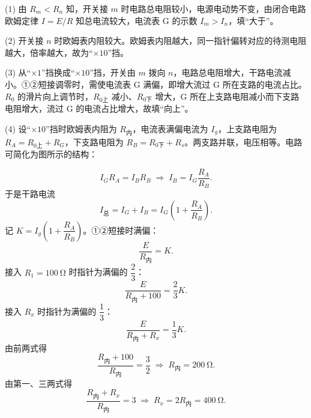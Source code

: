 \begin{answer}
(1) 由 $R_{m}<R_{n}$ 知，开关接 $m$ 时电路总电阻较小，电源电动势不变，由闭合电路欧姆定律 $I=E/R$ 知总电流较大，电流表 $\mathrm{G}$ 的示数 $I_{m}>I_{n}$，填“大于”。

(2) 开关接 $n$ 时欧姆表内阻较大。欧姆表内阻越大，同一指针偏转对应的待测电阻越大，倍率越大，故为“$\times10$”挡。

(3) 从“$\times1$”挡换成“$\times10$”挡，开关由 $m$ 拨向 $n$，电路总电阻增大，干路电流减小。①②短接调零时，需使电流表 $\mathrm{G}$ 满偏，即增大流过 $\mathrm{G}$ 所在支路的电流占比。$R_{0}$ 的滑片向上调节时，$R_{0\text{上}}$ 减小、$R_{0\text{下}}$ 增大，$\mathrm{G}$ 所在上支路电阻减小而下支路电阻增大，流过 $\mathrm{G}$ 的电流占比增大，故填“向上”。

(4) 设“$\times10$”挡时欧姆表内阻为 $R_{\text{内}}$，电流表满偏电流为 $I_{g}$，上支路电阻为 $R_{A}=R_{0\text{上}}+R_{G}$，下支路电阻为 $R_{B}=R_{0\text{下}}+R_{s}$。两支路并联，电压相等。电路可简化为图所示的结构：


\begin{equation*}
  I_{G}R_{A}=I_{B}R_{B}
  \;\Longrightarrow\;
  I_{B}=I_{G}\frac{R_{A}}{R_{B}} .
\end{equation*}
于是干路电流
\[
  I_{\text{总}}=I_{G}+I_{B}=I_{G}\left(1+\frac{R_{A}}{R_{B}}\right).
\]
记 $K=I_{g}\left(1+\dfrac{R_{A}}{R_{B}}\right)$。①②短接时满偏：
\[
  \frac{E}{R_{\text{内}}}=K .
\]
接入 $R_{1}=\SI{100}{\ohm}$ 时指针为满偏的 $\dfrac{2}{3}$：
\[
  \frac{E}{R_{\text{内}}+100}=\frac{2}{3}K .
\]
接入 $R_{x}$ 时指针为满偏的 $\dfrac{1}{3}$：
\[
  \frac{E}{R_{\text{内}}+R_{x}}=\frac{1}{3}K .
\]
由前两式得
\[
  \frac{R_{\text{内}}+100}{R_{\text{内}}}=\frac{3}{2}
  \;\Longrightarrow\;
  R_{\text{内}}=\SI{200}{\ohm}.
\]
由第一、三两式得
\[
  \frac{R_{\text{内}}+R_{x}}{R_{\text{内}}}=3
  \;\Longrightarrow\;
  R_{x}=2R_{\text{内}}=\SI{400}{\ohm}.
\]
\end{answer}

